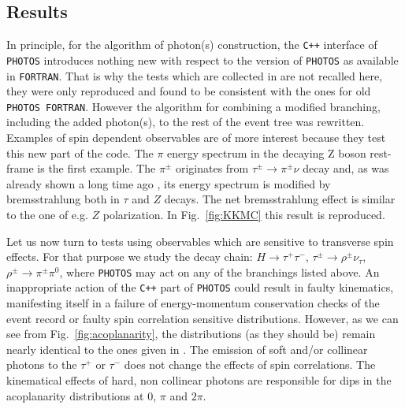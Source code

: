 \documentclass[]{Photos_interface_design}
\begin{document}
\subsection{Results}
\label{sec:results}
In principle, for the algorithm of  photon(s) construction, the {\tt C++} interface of
{\tt PHOTOS} introduces nothing new with respect to the 
version of {\tt PHOTOS} as available in {\tt FORTRAN}.
That is why the  tests which are collected in \cite{Photos_tests} are not
recalled here, they were only reproduced and found to be consistent with the ones for
old {\tt PHOTOS FORTRAN}.
However the algorithm for combining a modified branching, including the added 
photon(s), to the rest of the event tree was rewritten.
Examples of spin dependent observables are of more interest because they test this new part of the code.
The $\pi$ energy spectrum in the decaying
Z boson rest-frame is the first example. 
The $\pi^\pm$ originates from $\tau^\pm \to \pi^\pm \nu $ decay and, 
as was already shown a long time ago \cite{Boillot:1988re}, its energy spectrum is modified by bremsstrahlung both in $\tau$ and $Z$ decays. The net
bremsstrahlung  effect is similar to the one of e.g. $Z$ polarization. In Fig.~\ref{fig:KKMC} this result is reproduced.

Let us now turn to tests using observables which are sensitive to
transverse spin effects.  For that purpose we study the decay chain:
$H\to \tau^+\tau^-$, $\tau^\pm \to \rho^\pm \nu_\tau$, $\rho^\pm \to
\pi^\pm \pi^0$, where {\tt PHOTOS} may act on any of the branchings
listed above. An inappropriate action of the {\tt C++} part of {\tt PHOTOS}
could result in faulty kinematics, manifesting itself in a failure of
energy-momentum conservation checks of the event record or faulty spin
correlation sensitive distributions. However, as we can see from Fig.~\ref{fig:acoplanarity},
 the distributions (as they should be) remain nearly identical to the ones given in
\cite{tauolaC++,Davidson:2010rw}. The emission of soft and/or
collinear photons to the $\tau^+$ or $\tau^-$ does not change the
effects of spin correlations. The kinematical effects of hard,
non collinear  photons are responsible for dips in 
the acoplanarity distributions at $0$, $\pi$ and $2\pi$.
\end{document}
